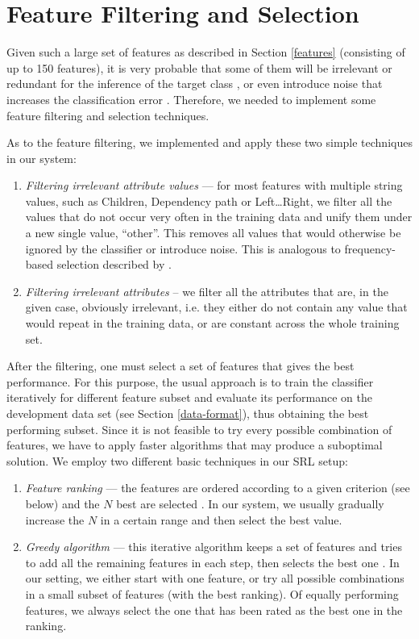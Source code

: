 \documentclass[12pt,notitlepage]{report}
\begin{document}
\section{Feature Filtering and Selection}\label{featsel}

Given such a large set of features as described in Section \ref{features} (consisting of up to 150 features), it is very probable that some of them will be irrelevant or redundant for the inference of the target class \citep{john94}, or even introduce noise that increases the classification error \citep[p. 251]{manning08}. Therefore, we needed to implement some feature filtering and selection techniques.

As to the feature filtering, we implemented and apply these two simple techniques in our system:
\begin{enumerate}
    \item \emph{Filtering irrelevant attribute values} --- for most features with multiple string values, such as Children, Dependency path or Left\dots Right, we filter all the values that do not occur very often in the training data and unify them under a new single value, ``other''. This removes all values that would otherwise be ignored by the classifier or introduce noise. This is analogous to frequency-based selection described by \citet[p. 257]{manning08}.
    \item \emph{Filtering irrelevant attributes} -- we filter all the attributes that are, in the given case, obviously irrelevant, i.e. they either do not contain any value that would repeat in the training data, or are constant across the whole training set.
\end{enumerate}

After the filtering, one must select a set of features that gives the best performance. For this purpose, the usual approach is to train the classifier iteratively for different feature subset and evaluate its performance on the development data set (see Section \ref{data-format}), thus obtaining the best performing subset. Since it is not feasible to try every possible combination of features, we have to apply faster algorithms that may produce a suboptimal solution. We employ two different basic techniques in our SRL setup:
\begin{enumerate}
    \item \emph{Feature ranking} --- the features are ordered according to a given criterion (see below) and the $N$ best are selected \cite[p. 251ff.]{manning08}. In our system, we usually gradually increase the $N$ in a certain range and then select the best value.
    \item \emph{Greedy algorithm} --- this iterative algorithm keeps a set of features and tries to add all the remaining features in each step, then selects the best one \cite{caruana94}. In our setting, we either start with one feature, or try all possible combinations in a small subset of features (with the best ranking). Of equally performing features, we always select the one that has been rated as the best one in the ranking.
\end{enumerate}
\end{document}
